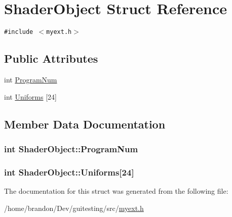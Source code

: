 \hypertarget{struct_shader_object}{
\section{ShaderObject Struct Reference}
\label{struct_shader_object}
}
{\tt \#include $<$myext.h$>$}

\subsection*{Public Attributes}
\begin{CompactItemize}
\item 
int \hyperlink{struct_shader_object_651e73ae0fff6e78d9fcd40cd507cc45}{ProgramNum}
\item 
int \hyperlink{struct_shader_object_b1d7a528c6ff7e7c27871283f66440ee}{Uniforms} \mbox{[}24\mbox{]}
\end{CompactItemize}


\subsection{Member Data Documentation}
\hypertarget{struct_shader_object_651e73ae0fff6e78d9fcd40cd507cc45}{
\subsubsection[{ProgramNum}]{\setlength{\rightskip}{0pt plus 5cm}int {\bf ShaderObject::ProgramNum}}}
\label{struct_shader_object_651e73ae0fff6e78d9fcd40cd507cc45}


\hypertarget{struct_shader_object_b1d7a528c6ff7e7c27871283f66440ee}{
\subsubsection[{Uniforms}]{\setlength{\rightskip}{0pt plus 5cm}int {\bf ShaderObject::Uniforms}\mbox{[}24\mbox{]}}}
\label{struct_shader_object_b1d7a528c6ff7e7c27871283f66440ee}




The documentation for this struct was generated from the following file:\begin{CompactItemize}
\item 
/home/brandon/Dev/guitesting/src/\hyperlink{myext_8h}{myext.h}\end{CompactItemize}
